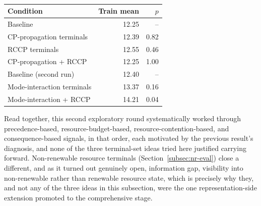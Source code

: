 \begin{table}[htbp]
  \centering
  \small
  \caption[Pilot results: enriched terminal sets]{}
  \label{tab:pilot-terminals-results}
  \begin{tabular}{lrr}
    \toprule
    \textbf{Condition} & \textbf{Train mean} & \textbf{$p$} \\
    \midrule
    Baseline                         & 12.25 & --    \\
    CP-propagation terminals         & 12.39 & 0.82  \\
    RCCP terminals                   & 12.55 & 0.46  \\
    CP-propagation + RCCP            & 12.25 & 1.00  \\
    \midrule
    Baseline (second run)            & 12.40 & --    \\
    Mode-interaction terminals       & 13.37 & 0.16  \\
    Mode-interaction + RCCP          & 14.21 & 0.04 \\
    \bottomrule
  \end{tabular}
\end{table}

Read together, this second exploratory round systematically worked through
precedence-based, resource-budget-based, resource-contention-based, and
consequence-based signals, in that order, each motivated by the previous
result's diagnosis, and none of the three terminal-set ideas tried here
justified carrying forward. Non-renewable resource terminals
(Section~\ref{subsec:nr-eval}) close a different, and as it turned out
genuinely open, information gap, visibility into non-renewable rather than
renewable resource state, which is precisely why they, and not any of the
three ideas in this subsection, were the one representation-side extension
promoted to the comprehensive stage.

\subsection{\texorpdfstring{}{Epsilon-lexicase selection and critical-path local search: staged evaluation}}
\label{subsec:pilot-lexicase-iteration}

